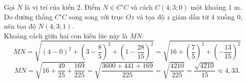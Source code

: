 \begin{ex}
{		Gọi $N$ là vị trí của kiến 2. Điểm $N \in C'C$ và cách $C(4;3;0)$ một khoảng $1$ m. \\
		Do đường thẳng $C'C$ song song với trục $Oz$ và tọa độ $z$ giảm dần từ $4$ xuống $0$, nên tọa độ $N(4; 3; 1)$.\\
		Khoảng cách giữa hai con kiến lúc này là $MN$:
		$$MN = \sqrt{(4-0)^2 + \left(3 - \dfrac{8}{5}\right)^2 + \left(1 - \dfrac{28}{15}\right)^2} = \sqrt{16 + \left(\dfrac{7}{5}\right)^2 + \left(-\dfrac{13}{15}\right)^2}$$
		$$MN = \sqrt{16 + \dfrac{49}{25} + \dfrac{169}{225}} = \sqrt{\dfrac{3600 + 441 + 169}{225}} = \sqrt{\dfrac{4210}{225}} = \dfrac{\sqrt{4210}}{15} \approx 4,33.$$
	}
\end{ex}
